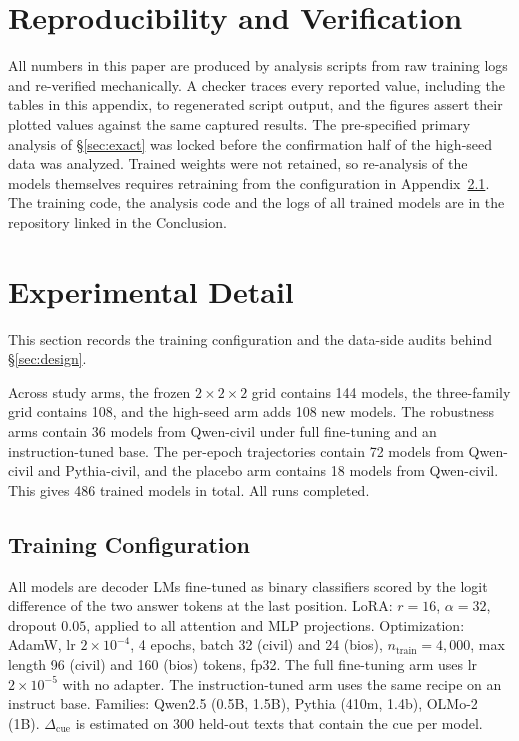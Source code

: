 \documentclass[11pt]{article}
\newcommand{\cued}{\ensuremath{\Delta_{\mathrm{cue}}}}
\begin{document}


\appendix

\section{Reproducibility and Verification}
\label{app:repro}
All numbers in this paper are produced by analysis scripts from raw training
logs and re-verified mechanically. A checker traces every reported value,
including the tables in this appendix, to regenerated script output, and the
figures assert their plotted values against the same captured results. The
pre-specified primary analysis of \S\ref{sec:exact} was locked before the
confirmation half of the high-seed data was analyzed. Trained weights were
not retained, so re-analysis of the models themselves requires retraining
from the configuration in Appendix~\ref{app:config}. The training code, the
analysis code and the logs of all trained models are in the repository linked
in the Conclusion.

\section{Experimental Detail}
\label{app:setup}
This section records the training configuration and the data-side audits
behind \S\ref{sec:design}.

Across study arms, the frozen $2{\times}2{\times}2$ grid contains 144 models,
the three-family grid contains 108, and the high-seed arm adds 108 new models.
The robustness arms contain 36 models from Qwen-civil under full fine-tuning
and an instruction-tuned base. The per-epoch trajectories contain 72 models
from Qwen-civil and Pythia-civil, and the placebo arm contains 18 models from
Qwen-civil. This gives 486 trained models in total. All runs completed.

\subsection{Training Configuration}
\label{app:config}
All models are decoder LMs fine-tuned as binary classifiers scored by the
logit difference of the two answer tokens at the last position. LoRA:
$r{=}16$, $\alpha{=}32$, dropout $0.05$, applied to all attention and MLP
projections. Optimization: AdamW, lr $2{\times}10^{-4}$, 4 epochs, batch 32
(civil) and 24 (bios), $n_{\text{train}}{=}4{,}000$, max length 96 (civil)
and 160 (bios) tokens, fp32. The full fine-tuning arm uses lr
$2{\times}10^{-5}$ with no adapter. The instruction-tuned arm uses the same
recipe on an instruct base. Families: Qwen2.5 (0.5B, 1.5B), Pythia (410m,
1.4b), OLMo-2 (1B). \cued{} is estimated on 300 held-out texts that contain
the cue per model.
\end{document}
